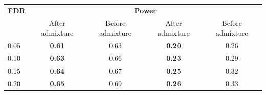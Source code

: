 \clearpage
\newpage 

\begin{table}
\begin{center}
\begin{tabular}{lcccc}
 \hline
\textbf{FDR}  & \multicolumn{4}{c}{\textbf{Power}}  \\
 & After admixture & Before admixture & After admixture & Before admixture  \\
\hline
 0.05 & {\bf 0.61} & 0.63 & {\bf 0.20} & 0.26 \\
 0.10 & {\bf 0.63} & 0.66 & {\bf 0.23} & 0.29 \\
 0.15 & {\bf 0.64} & 0.67 & {\bf 0.25} & 0.32 \\
 0.20 & {\bf 0.65} & 0.69 & {\bf 0.26} & 0.33 \\
 \hline
\end{tabular}
\end{center}
\hspace{1cm}
\end{table}

\clearpage	